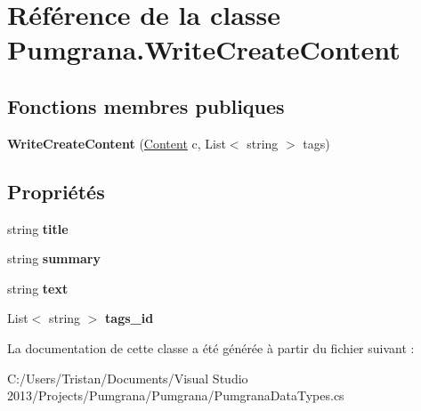 \hypertarget{class_pumgrana_1_1_write_create_content}{\section{Référence de la classe Pumgrana.\+Write\+Create\+Content}
\label{class_pumgrana_1_1_write_create_content}
}
\subsection*{Fonctions membres publiques}
\begin{DoxyCompactItemize}
\item 
\hypertarget{class_pumgrana_1_1_write_create_content_a473a4d5e05b5d6154234da2efd904452}{{\bfseries Write\+Create\+Content} (\hyperlink{class_pumgrana_1_1_content}{Content} c, List$<$ string $>$ tags)}\label{class_pumgrana_1_1_write_create_content_a473a4d5e05b5d6154234da2efd904452}

\end{DoxyCompactItemize}
\subsection*{Propriétés}
\begin{DoxyCompactItemize}
\item 
\hypertarget{class_pumgrana_1_1_write_create_content_af6ebcd4cccf7d2d8c5c7937c80ef8c6e}{string {\bfseries title}}\label{class_pumgrana_1_1_write_create_content_af6ebcd4cccf7d2d8c5c7937c80ef8c6e}

\item 
\hypertarget{class_pumgrana_1_1_write_create_content_a8a282c1b48d5253fe939963f11adb34a}{string {\bfseries summary}}\label{class_pumgrana_1_1_write_create_content_a8a282c1b48d5253fe939963f11adb34a}

\item 
\hypertarget{class_pumgrana_1_1_write_create_content_a2f0aade691393647ec01016fe925fe22}{string {\bfseries text}}\label{class_pumgrana_1_1_write_create_content_a2f0aade691393647ec01016fe925fe22}

\item 
\hypertarget{class_pumgrana_1_1_write_create_content_af2d184798997343bad26d869373dce20}{List$<$ string $>$ {\bfseries tags\+\_\+id}}\label{class_pumgrana_1_1_write_create_content_af2d184798997343bad26d869373dce20}

\end{DoxyCompactItemize}


La documentation de cette classe a été générée à partir du fichier suivant \+:\begin{DoxyCompactItemize}
\item 
C\+:/\+Users/\+Tristan/\+Documents/\+Visual Studio 2013/\+Projects/\+Pumgrana/\+Pumgrana/Pumgrana\+Data\+Types.\+cs\end{DoxyCompactItemize}
